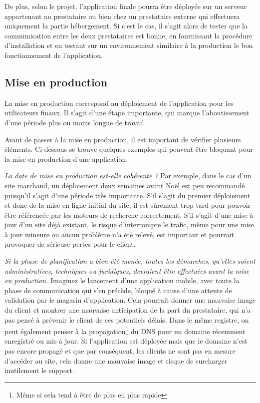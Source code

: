 De plus, selon le projet, l'application finale pourra être déployée sur un serveur appartenant au prestataire ou bien chez un prestataire externe qui effectuera uniquement la partie hébergement. Si c'est le cas, il s'agit alors de tester que la communication entre les deux prestataires est bonne, en fournissant la procédure d'installation et en testant sur un environnement similaire à la production le bon fonctionnement de l'application.

\subsection{Mise en production}


La mise en production correspond au déploiement de l'application pour les utilisateurs finaux. Il s'agit d'une étape importante, qui marque l'aboutissement d'une période plus ou moins longue de travail.

Avant de passer à la mise en production, il est important de vérifier plusieurs éléments. Ci-dessous se trouve quelques exemples qui peuvent être bloquant pour la mise en production d'une application.

\textit{La date de mise en production est-elle cohérente ?} Par exemple, dans le cas d'un site marchand, un déploiement deux semaines avant Noël est peu recommandé puisqu'il s'agit d'une période très importante. S'il s'agit du premier déploiement et donc de la mise en ligne initial du site, il est sûrement trop tard pour pouvoir être référencée par les moteurs de recherche correctement. S'il s'agit d'une mise à jour d'un site déjà existant, le risque d'interrompre le trafic, même pour une mise à jour mineure ou aucun problème n'a été relevé, est important et pourrait provoquer de sérieuse pertes pour le client.

\textit{Si la phase de planification a bien été menée, toutes les démarches, qu'elles soient administratives, techniques ou juridiques, devraient être effectuées avant la mise en production.} Imaginez le lancement d'une application mobile, avec toute la phase de communication qui s'en précède, bloqué à cause d'une attente de validation par le magasin d'application. Cela pourrait donner une mauvaise image du client et montrer une mauvaise anticipation de la part du prestataire, qui n'a pas pensé à prévenir le client de ces potentiels délais. Dans le même registre, on peut également penser à la propagation\footnote{Même si cela tend à être de plus en plus rapide} du \gls{DNS} pour un domaine récemment enregistré ou mis à jour. Si l'application est déployée mais que le domaine n'est pas encore propagé et que par conséquent, les clients ne sont pas en mesure d'accéder au site, cela donne une mauvaise image et risque de surcharger inutilement le support.

